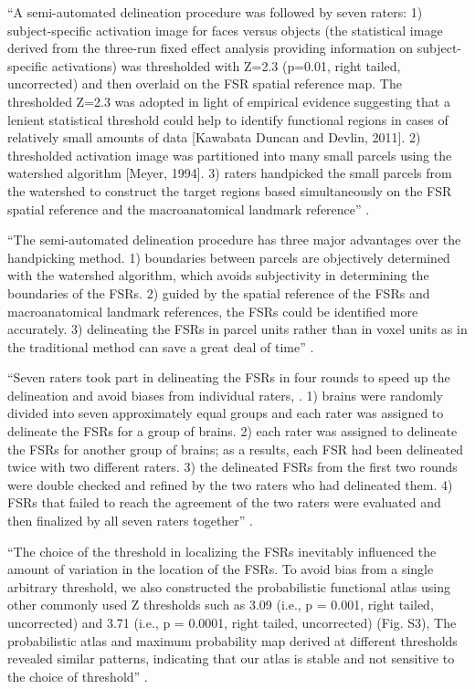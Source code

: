 ``A semi-automated delineation procedure was followed by seven raters:
%
1) subject-specific activation image for faces versus objects (the statistical
image derived from the three-run fixed effect analysis providing information on
subject-specific activations) was thresholded with Z=2.3 (p=0.01, right tailed,
uncorrected) and then overlaid on the FSR spatial reference map.
%
The thresholded Z=2.3 was adopted in light of empirical evidence suggesting
that a lenient statistical threshold could help to identify functional regions
in cases of relatively small amounts of data [Kawabata Duncan and Devlin, 2011].
%
2) thresholded activation image was partitioned into many small parcels using
the watershed algorithm [Meyer, 1994].
%
3) raters handpicked the small parcels from the watershed to construct the
target regions based simultaneously on the FSR spatial reference and the
macroanatomical landmark reference'' \citet{zhen2015quantifying}.

``The semi-automated delineation procedure has three major advantages over the
handpicking method.
%
1) boundaries between parcels are objectively determined with the watershed
algorithm, which avoids subjectivity in determining the boundaries of the FSRs.
%
2) guided by the spatial reference of the FSRs and macroanatomical landmark
references, the FSRs could be identified more accurately.
%
3) delineating the FSRs in parcel units rather than in voxel units as in the
traditional method can save a great deal of time'' \citet{zhen2015quantifying}.

``Seven raters took part in delineating the FSRs in four rounds to speed up the
delineation and avoid biases from individual raters, .
%
1) brains were randomly divided into seven approximately equal groups and each
rater was assigned to delineate the FSRs for a group of brains.
%
2) each rater was assigned to delineate the FSRs for another group of brains;
%
as a results, each FSR had been delineated twice with two different raters.
%
3) the delineated FSRs from the first two rounds were double checked and refined
by the two raters who had delineated them.
%
4) FSRs that failed to reach the agreement of the two raters were evaluated and
then finalized by all seven raters together'' \citet{zhen2015quantifying}.

``The choice of the threshold in localizing the FSRs inevitably influenced the
amount of variation in the location of the FSRs.
%
To avoid bias from a single arbitrary threshold, we also constructed the
probabilistic functional atlas using other commonly used Z thresholds such as
3.09 (i.e., p = 0.001, right tailed, uncorrected) and 3.71 (i.e., p = 0.0001,
right tailed, uncorrected) (Fig. S3),
%
The probabilistic atlas and maximum probability map derived at different
thresholds revealed similar patterns, indicating that our atlas is stable and
not sensitive to the choice of threshold'' \citep{zhen2015quantifying}.

